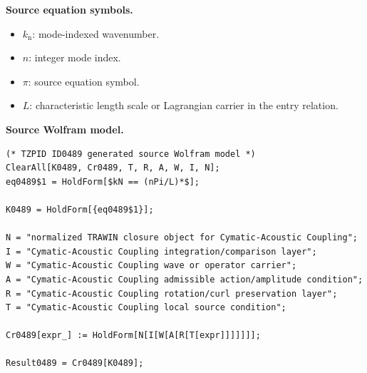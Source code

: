 \begin{minipage}[t]{0.49\linewidth}
\begingroup
\small
\raggedright
\textbf{Source equation symbols.}\par
\begin{itemize}[leftmargin=1.35em,itemsep=1pt,topsep=1pt,parsep=0pt]
    \item $k_{\mathrm{n}}$: mode-indexed wavenumber.
    \item $n$: integer mode index.
    \item $\pi$: source equation symbol.
    \item $L$: characteristic length scale or Lagrangian carrier in the entry relation.
\end{itemize}
\endgroup
\end{minipage}\hfill
\begin{minipage}[t]{0.47\linewidth}
\begingroup
\scriptsize
\raggedright
\textbf{Source Wolfram model.}\par
\begin{Verbatim}[fontsize=\tiny,breaklines=true,breakanywhere=true]
(* TZPID ID0489 generated source Wolfram model *)
ClearAll[K0489, Cr0489, T, R, A, W, I, N];
eq0489$1 = HoldForm[$kN == (nPi/L)*$];

K0489 = HoldForm[{eq0489$1}];

N = "normalized TRAWIN closure object for Cymatic-Acoustic Coupling";
I = "Cymatic-Acoustic Coupling integration/comparison layer";
W = "Cymatic-Acoustic Coupling wave or operator carrier";
A = "Cymatic-Acoustic Coupling admissible action/amplitude condition";
R = "Cymatic-Acoustic Coupling rotation/curl preservation layer";
T = "Cymatic-Acoustic Coupling local source condition";

Cr0489[expr_] := HoldForm[N[I[W[A[R[T[expr]]]]]]];

Result0489 = Cr0489[K0489];
\end{Verbatim}
\endgroup
\end{minipage}

